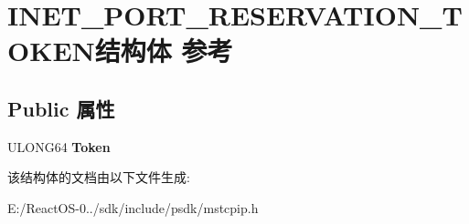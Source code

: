 \hypertarget{struct_i_n_e_t___p_o_r_t___r_e_s_e_r_v_a_t_i_o_n___t_o_k_e_n}{}\section{I\+N\+E\+T\+\_\+\+P\+O\+R\+T\+\_\+\+R\+E\+S\+E\+R\+V\+A\+T\+I\+O\+N\+\_\+\+T\+O\+K\+E\+N结构体 参考}
\label{struct_i_n_e_t___p_o_r_t___r_e_s_e_r_v_a_t_i_o_n___t_o_k_e_n}
\subsection*{Public 属性}
\begin{DoxyCompactItemize}
\item 
\mbox{\label{struct_i_n_e_t___p_o_r_t___r_e_s_e_r_v_a_t_i_o_n___t_o_k_e_n_a4b7f6461ebfe7abdbc845cdefb490afe}} 
U\+L\+O\+N\+G64 {\bfseries Token}
\end{DoxyCompactItemize}


该结构体的文档由以下文件生成\+:\begin{DoxyCompactItemize}
\item 
E\+:/\+React\+O\+S-\/0../sdk/include/psdk/mstcpip.\+h\end{DoxyCompactItemize}
